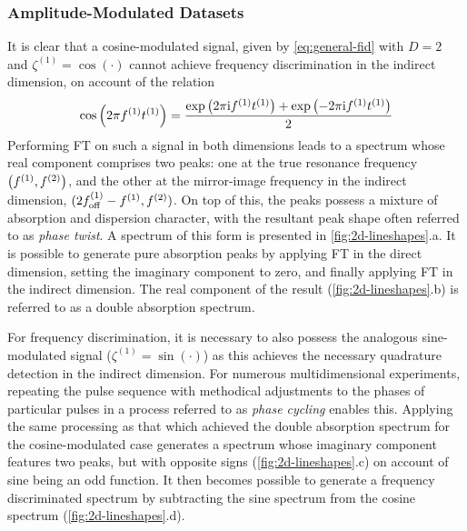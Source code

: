 \subsubsection{Amplitude-Modulated Datasets}
It is clear that a cosine-modulated signal, given by \cref{eq:general-fid}
with $D=2$ and $\zeta^{(1)} = \cos(\cdot)$ cannot achieve frequency
discrimination in the indirect dimension, on account of the relation
\begin{equation}
    \cos\left(2 \pi f^{(1)} t^{(1)}\right) =
    \frac{\exp\left(2 \pi \mathrm{i} f^{(1)} t^{(1)} \right) + \exp\left(-2 \pi \mathrm{i} f^{(1)} t^{(1)} \right)}{2}
\end{equation}
Performing \ac{FT} on such a signal in both dimensions leads to a spectrum
whose real component comprises two peaks: one at the true resonance frequency
$\left(f^{(1)}, f^{(2)}\right)$, and the other at the mirror-image frequency in the
indirect dimension, $(2f_{\mathrm{off}}^{(1)} - f^{(1)}, f^{(2)})$. On top of this, the
peaks possess a mixture of absorption and dispersion character, with the
resultant peak shape often referred to as \emph{phase twist}\cite{Keeler1985}.
A spectrum of this form is presented in \cref{fig:2d-lineshapes}.a.
It is possible to generate pure absorption peaks by applying \ac{FT} in the
direct dimension, setting the imaginary component to zero, and finally
applying \ac{FT} in the indirect dimension. The real component of the result
(\cref{fig:2d-lineshapes}.b) is referred to as a double absorption spectrum.

For frequency discrimination, it is necessary to also possess the
analogous sine-modulated signal ($\zeta^{(1)} = \sin(\cdot)$) as this
achieves the necessary quadrature detection in the indirect dimension. For
numerous multidimensional experiments, repeating the
pulse sequence with methodical adjustments to the phases of particular pulses
in a process referred to as \emph{phase cycling} enables
this\cite[Chapter 11]{Keeler2010}.
Applying the same processing as that which achieved the double absorption
spectrum for the cosine-modulated case generates a spectrum whose imaginary
component features two peaks, but with opposite signs
(\cref{fig:2d-lineshapes}.c) on account of sine being an odd function.
It then becomes possible to generate a frequency discriminated spectrum by
subtracting the sine spectrum from the cosine spectrum
(\cref{fig:2d-lineshapes}.d).

